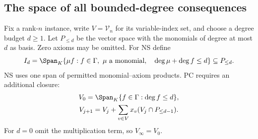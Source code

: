 \subsection{The space of all bounded-degree consequences}\label{sec:pc-space}
Fix a rank-$n$ instance, write $V=\mathcal V_n$ for its variable-index
set, and choose a degree budget $d\ge1$. Let $P_{\le d}$ be the
vector space with the monomials of degree at most $d$ as basis. Zero
axioms may be omitted. For NS define
\begin{equation}\label{eq:nsspan}
 I_d=\Span_K\{\mu f:f\in\Gamma,\ \mu\text{ a monomial},\quad
                       \deg\mu+\deg f\le d\}\subseteq P_{\le d}.
\end{equation}
NS uses one span of permitted monomial--axiom products. PC requires an
additional closure:
\begin{equation}\label{eq:pcclosure}
 \begin{gathered}
 V_0=\Span_K\{f\in\Gamma:\deg f\le d\},\\
 V_{j+1}=V_j+\sum_{v\in V}x_v(V_j\cap P_{\le d-1}).
 \end{gathered}
\end{equation}
For $d=0$ omit the multiplication term, so $V_\infty=V_0$.

